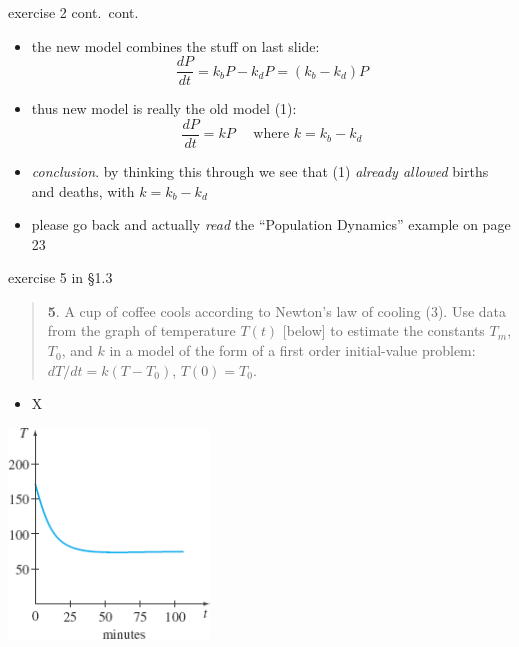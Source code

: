 \documentclass{beamer}
\begin{document}
\begin{frame}{exercise 2 cont.~cont.}

\begin{itemize}
\item the new model combines the stuff on last slide:
    $$\frac{dP}{dt} = k_b P - k_d P = (k_b-k_d) P$$
\item thus new model is really the old model (1):
    $$\frac{dP}{dt} = k P \quad \text{ where } k = k_b-k_d$$

\bigskip
\item \emph{conclusion}.  by thinking this through we see that (1) \emph{already allowed} births and deaths, with $k=k_b-k_d$

\bigskip
\item \alert{please go back and actually \emph{read} the ``Population Dynamics'' example on page 23}
\end{itemize}
\end{frame}


\begin{frame}{exercise 5 in \S 1.3}

\scriptsize
\begin{quotation}
\noindent \textbf{5}.  A cup of coffee cools according to Newton's law of cooling (3).  Use data from the graph of temperature $T(t)$ [below] to estimate the constants $T_m$, $T_0$, and $k$ in a model of the form of a first order initial-value problem: $dT/dt = k(T-T_0)$, $T(0)=T_0$.
\end{quotation}

\begin{itemize}
\item X
\end{itemize}

\includegraphics[width=0.4\textwidth]{exercise-5-1-3}
\end{frame}
\end{document}
